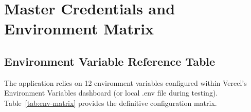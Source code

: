\documentclass[11pt,a4paper,oneside]{report}
\def\texttt#1{#1}
\def\&{and}
\begin{document}
\chapter{Master Credentials \texorpdfstring{\&}{and} Environment Matrix}

\section{Environment Variable Reference Table}

The application relies on 12 environment variables configured within Vercel's
Environment Variables dashboard (or local \texttt{.env} file during testing).
Table~\ref{tab:env-matrix} provides the definitive configuration matrix.
\end{document}
